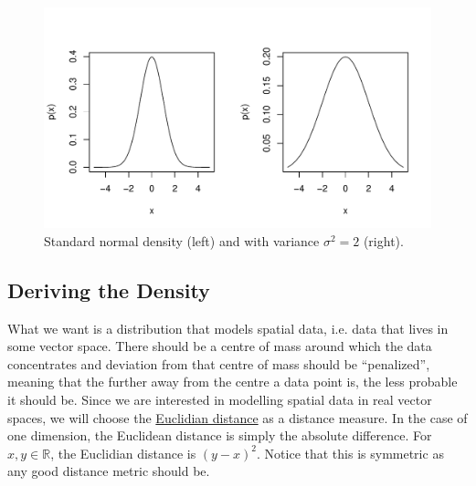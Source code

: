 \documentclass[a4paper,11pt,leqno]{report}\usepackage[]{graphicx}\usepackage[]{color}
\makeatletter
\def\maxwidth{ %
  \ifdim\Gin@nat@width>\linewidth
    \linewidth
  \else
    \Gin@nat@width
  \fi
}
\newenvironment{knitrout}{}{} %
\makeatother
\begin{document}
\begin{figure}
\center
\begin{knitrout}
\color{fgcolor}
\includegraphics[width=\maxwidth]{figures/uniGauss-1} 

\end{knitrout}
\caption{Standard normal density (left) and with variance $ \sigma^{2} = 2 $ (right).}
\label{fig:uniGauss}
\end{figure}

\subsection{Deriving the Density}

What we want is a distribution that models spatial data, i.e. data that lives in some vector space. There should be a centre of mass around which the data concentrates
and deviation from that centre of mass should be ``penalized'', meaning that the further away from the centre a data point is, the less probable it should be.
Since we are interested in modelling spatial data in real vector spaces, we will choose the \href{https://en.wikipedia.org/wiki/Euclidean_distance}{Euclidian
distance} as a distance measure. In the case of one dimension, the Euclidean distance is simply the absolute difference. For $ x,y \in \mathbb{R} $, the Euclidian
distance is $ (y - x)^{2} $. Notice that this is symmetric as any good distance metric should be. 
\end{document}
